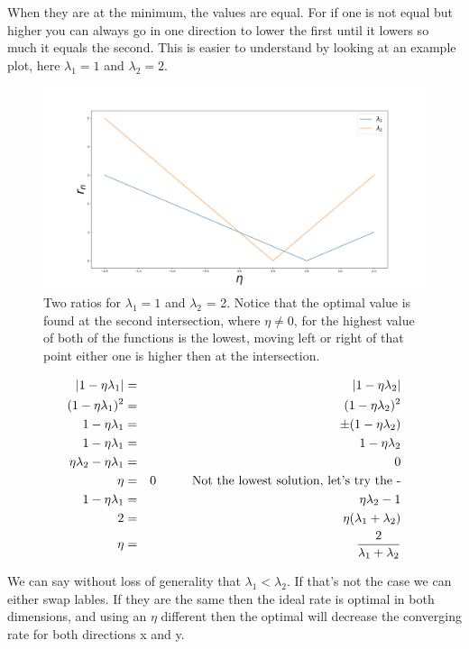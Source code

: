 \documentclass[a4paper]{article}
\newcommand\tab[1][1cm]{\hspace*{#1}}
\begin{document}
When they are at the minimum, the values are equal. For if one is not equal but higher you can always go in one direction to lower the first until it lowers so much it equals the second. This is easier to understand by looking at an example plot, here $\lambda_1 = 1$ and $\lambda_2 = 2$.

\begin{figure}[H]
\includegraphics[width=\textwidth]{Images/32b.png}
\caption{Two ratios for $\lambda_1 = 1$ and $\lambda_2$ = 2. Notice that the optimal value is found at the second intersection, where $\eta \neq 0$, for the highest value of both of the functions is the lowest, moving left or right of that point either one is higher then at the intersection.}
\label{Converg}
\end{figure}

\begin{eqnarray}
\abs{1-\eta \lambda_1} &=& \abs{1-\eta \lambda_2}\\
(1-\eta \lambda_1)^2 &=& (1- \eta \lambda_2)^2\\
1 - \eta \lambda_1 &=& \pm (1-\eta \lambda_2)\\
1 - \eta \lambda_1 &=& 1 - \eta \lambda_2\\
\eta \lambda_2 - \eta \lambda_1 &=& 0 \\
\eta &=& 0 \tab \text{Not the lowest solution, let's try the -}\\
1 - \eta \lambda_1 &=& \eta \lambda_2 - 1\\
2 &=& \eta (\lambda_1 + \lambda_2)\\
\eta &=& \frac{2}{\lambda_1 + \lambda_2}
\end{eqnarray}

We can say without loss of generality that $\lambda_1 < \lambda_2$. If that's not the case we can either swap lables. If they are the same then the ideal rate is optimal in both dimensions, and using an $\eta$ different then the optimal will decrease the converging rate for both directions x and y.
\end{document}

